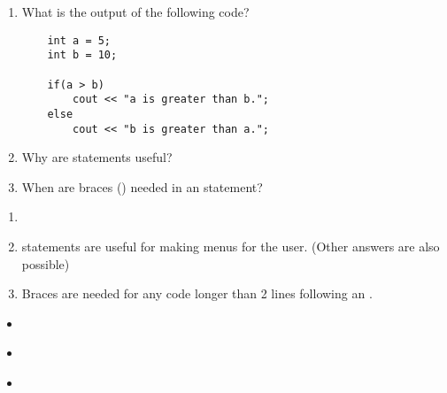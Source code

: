 \begin{enumerate}
\item What is the output of the following code?
\begin{lstlisting}
	int a = 5;
	int b = 10;

	if(a > b)
		cout << "a is greater than b.";
	else
		cout << "b is greater than a.";
\end{lstlisting}

\item Why are  statements useful?

\item When are braces (\Code{\{\}}) needed in an  statement?
\end{enumerate}



\begin{enumerate}
\item {}
\item {} statements are useful for making menus for the user. (Other answers are also possible)
\item Braces are needed for any code longer than 2 lines following an .
\end{enumerate}



\begin{itemize}
\item ~
\item ~
\item ~
\end{itemize}	

